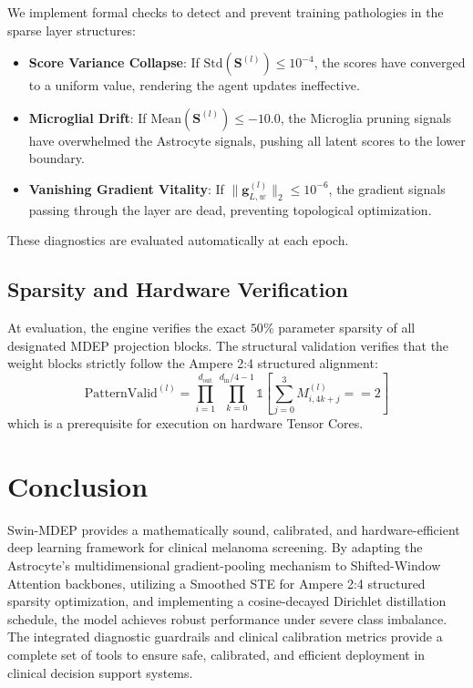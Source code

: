 \documentclass[11pt]{article}
\begin{document}
We implement formal checks to detect and prevent training pathologies in the sparse layer structures:
\begin{itemize}
    \item \textbf{Score Variance Collapse}: If $\text{Std}(\bm{S}^{(l)}) \le 10^{-4}$, the scores have converged to a uniform value, rendering the agent updates ineffective.
    \item \textbf{Microglial Drift}: If $\text{Mean}(\bm{S}^{(l)}) \le -10.0$, the Microglia pruning signals have overwhelmed the Astrocyte signals, pushing all latent scores to the lower boundary.
    \item \textbf{Vanishing Gradient Vitality}: If $\|\bm{g}_{L,w}^{(l)}\|_2 \le 10^{-6}$, the gradient signals passing through the layer are dead, preventing topological optimization.
\end{itemize}
These diagnostics are evaluated automatically at each epoch.

\subsection{Sparsity and Hardware Verification}

At evaluation, the engine verifies the exact $50\%$ parameter sparsity of all designated MDEP projection blocks. The structural validation verifies that the weight blocks strictly follow the Ampere 2:4 structured alignment:
\begin{equation}
    \text{PatternValid}^{(l)} = \prod_{i=1}^{d_{\text{out}}} \prod_{k=0}^{d_{\text{in}}/4 - 1} \mathbb{1}\left[\sum_{j=0}^3 M_{i, 4k+j}^{(l)} == 2\right]
\end{equation}
which is a prerequisite for execution on hardware Tensor Cores.

\section{Conclusion}\label{sec:conclusion}

Swin-MDEP provides a mathematically sound, calibrated, and hardware-efficient deep learning framework for clinical melanoma screening. By adapting the Astrocyte's multidimensional gradient-pooling mechanism to Shifted-Window Attention backbones, utilizing a Smoothed STE for Ampere 2:4 structured sparsity optimization, and implementing a cosine-decayed Dirichlet distillation schedule, the model achieves robust performance under severe class imbalance. The integrated diagnostic guardrails and clinical calibration metrics provide a complete set of tools to ensure safe, calibrated, and efficient deployment in clinical decision support systems.
\end{document}
